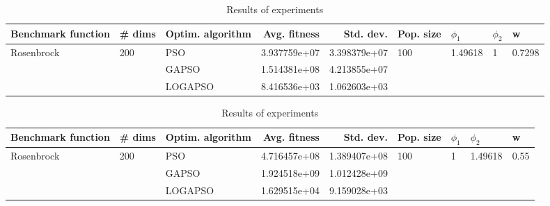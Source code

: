 \documentclass{article}
\begin{document}
\begin{table}
\centering
\caption{Results of experiments}
\begin{tabular}{lllrrllll}
\toprule
         Benchmark function &              \# dims & Optim. algorithm &  Avg. fitness &    Std. dev. &            Pop. size &               $\phi_{1}$ &         $\phi_{2}$ &                       w \\
\midrule
\multirow{3}{*}{Rosenbrock} & \multirow{3}{*}{200} &              PSO &  3.937759e+07 & 3.398379e+07 & \multirow{3}{*}{100} & \multirow{3}{*}{1.49618} & \multirow{3}{*}{1} & \multirow{3}{*}{0.7298} \\
                            &                      &            GAPSO &  1.514381e+08 & 4.213855e+07 &                      &                          &                    &                         \\
                            &                      &          LOGAPSO &  8.416536e+03 & 1.062603e+03 &                      &                          &                    &                         \\
\bottomrule
\end{tabular}
\end{table}
\begin{table}
\centering
\caption{Results of experiments}
\begin{tabular}{lllrrllll}
\toprule
         Benchmark function &              \# dims & Optim. algorithm &  Avg. fitness &    Std. dev. &            Pop. size &         $\phi_{1}$ &               $\phi_{2}$ &                     w \\
\midrule
\multirow{3}{*}{Rosenbrock} & \multirow{3}{*}{200} &              PSO &  4.716457e+08 & 1.389407e+08 & \multirow{3}{*}{100} & \multirow{3}{*}{1} & \multirow{3}{*}{1.49618} & \multirow{3}{*}{0.55} \\
                            &                      &            GAPSO &  1.924518e+09 & 1.012428e+09 &                      &                    &                          &                       \\
                            &                      &          LOGAPSO &  1.629515e+04 & 9.159028e+03 &                      &                    &                          &                       \\
\bottomrule
\end{tabular}
\end{table}
\end{document}
